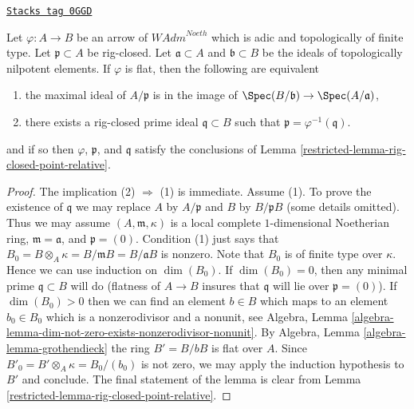 \begin{lemma}
\label{restricted-lemma-rig-closed-point-in-image}
\href{https://stacks.math.columbia.edu/tag/0GGD}{\texttt{Stacks tag 0GGD}}

Let $\varphi : A \to B$ be an arrow of $\textit{WAdm}^{Noeth}$
which is adic and topologically of finite type.
Let $\mathfrak p \subset A$ be rig-closed.
Let $\mathfrak a \subset A$ and $\mathfrak b \subset B$
be the ideals of topologically nilpotent elements. If $\varphi$
is flat, then the following are equivalent
\begin{enumerate}
\item the maximal ideal of $A/\mathfrak p$ is in the image of
$\Spec(B/\mathfrak b) \to \Spec(A/\mathfrak a)$,
\item there exists a rig-closed prime ideal $\mathfrak q \subset B$
such that $\mathfrak p = \varphi^{-1}(\mathfrak q)$.
\end{enumerate}
and if so then $\varphi$, $\mathfrak p$, and $\mathfrak q$
satisfy the conclusions of Lemma \ref{restricted-lemma-rig-closed-point-relative}.
\end{lemma}

\begin{proof}

The implication (2) $\Rightarrow$ (1) is immediate. Assume (1).
To prove the existence of $\mathfrak q$
we may replace $A$ by $A/\mathfrak p$ and $B$ by $B/\mathfrak p B$
(some details omitted). Thus we may assume $(A, \mathfrak m, \kappa)$
is a local complete $1$-dimensional Noetherian ring,
$\mathfrak m = \mathfrak a$, and $\mathfrak p = (0)$. Condition (1)
just says that $B_0 = B \otimes_A \kappa = B/\mathfrak m B = B/\mathfrak a B$
is nonzero. Note that $B_0$ is of finite type over $\kappa$.
Hence we can use induction on $\dim(B_0)$.
If $\dim(B_0) = 0$, then any minimal prime $\mathfrak q \subset B$
will do (flatness of $A \to B$ insures that $\mathfrak q$ will
lie over $\mathfrak p = (0)$).
If $\dim(B_0) > 0$ then we can find an element $b \in B$
which maps to an element $b_0 \in B_0$ which is a nonzerodivisor
and a nonunit, see Algebra, Lemma
\ref{algebra-lemma-dim-not-zero-exists-nonzerodivisor-nonunit}.
By Algebra, Lemma \ref{algebra-lemma-grothendieck}
the ring $B' = B/bB$ is flat over $A$. Since
$B'_0 = B' \otimes_A \kappa = B_0/(b_0)$ is not zero,
we may apply the induction hypothesis to $B'$ and conclude.
The final statement of the lemma is clear from
Lemma \ref{restricted-lemma-rig-closed-point-relative}.
\end{proof}


